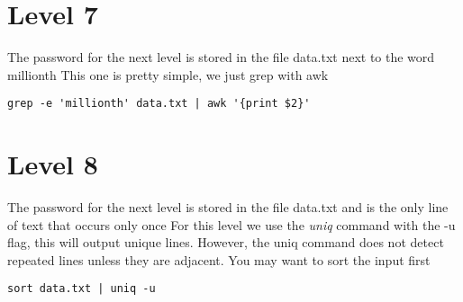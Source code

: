 \documentclass{report}
\begin{document}
    \pagebreak 
    \section*{Level 7}
    \bigbreak \noindent 
    The password for the next level is stored in the file data.txt next to the word millionth
    \bigbreak \noindent 
    This one is pretty simple, we just grep with awk
    \bigbreak \noindent 
    \begin{verbatim}
grep -e 'millionth' data.txt | awk '{print $2}'
    \end{verbatim}
    \bigbreak \noindent

    \bigbreak \noindent 
    \section*{Level 8}
    \bigbreak \noindent 
    The password for the next level is stored in the file data.txt and is the only line of text that occurs only once
    \bigbreak \noindent 
    For this level we use the \textit{uniq} command with the -u flag, this will output unique lines. However, the uniq command  does not detect repeated lines unless they are adjacent.  You may want to sort the input first
    \bigbreak \noindent 
    \begin{verbatim}
sort data.txt | uniq -u
    \end{verbatim}
    \bigbreak \noindent





    
\end{document}
